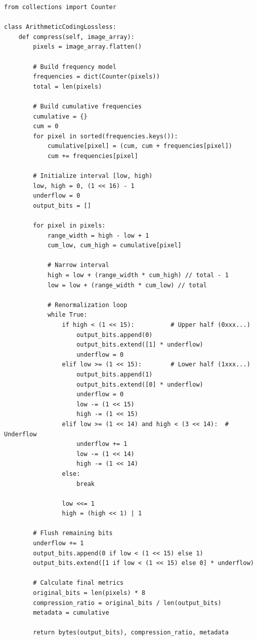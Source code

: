 \begin{verbatim}
from collections import Counter

class ArithmeticCodingLossless:
    def compress(self, image_array):
        pixels = image_array.flatten()
        
        # Build frequency model
        frequencies = dict(Counter(pixels))
        total = len(pixels)
        
        # Build cumulative frequencies
        cumulative = {}
        cum = 0
        for pixel in sorted(frequencies.keys()):
            cumulative[pixel] = (cum, cum + frequencies[pixel])
            cum += frequencies[pixel]
            
        # Initialize interval [low, high)
        low, high = 0, (1 << 16) - 1
        underflow = 0
        output_bits = []
        
        for pixel in pixels:
            range_width = high - low + 1
            cum_low, cum_high = cumulative[pixel]
            
            # Narrow interval
            high = low + (range_width * cum_high) // total - 1
            low = low + (range_width * cum_low) // total
            
            # Renormalization loop
            while True:
                if high < (1 << 15):          # Upper half (0xxx...)
                    output_bits.append(0)
                    output_bits.extend([1] * underflow)
                    underflow = 0
                elif low >= (1 << 15):        # Lower half (1xxx...)
                    output_bits.append(1)
                    output_bits.extend([0] * underflow)
                    underflow = 0
                    low -= (1 << 15)
                    high -= (1 << 15)
                elif low >= (1 << 14) and high < (3 << 14):  # Underflow
                    underflow += 1
                    low -= (1 << 14)
                    high -= (1 << 14)
                else:
                    break
                    
                low <<= 1
                high = (high << 1) | 1
                
        # Flush remaining bits
        underflow += 1
        output_bits.append(0 if low < (1 << 15) else 1)
        output_bits.extend([1 if low < (1 << 15) else 0] * underflow)
        
        # Calculate final metrics
        original_bits = len(pixels) * 8
        compression_ratio = original_bits / len(output_bits)
        metadata = cumulative
        
        return bytes(output_bits), compression_ratio, metadata
\end{verbatim}

